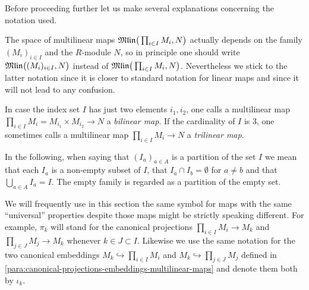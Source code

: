 \begin{remarks}
  Before proceeding further let us make several explanations concerning the notation used.
  \begin{environmentlist}
  \item
    The space of multilinear maps $ \mathfrak{Mlin} \big(\prod_{i\in I} M_i,N\big)$ actually depends
    on the family $(M_i)_{i\in I}$ and the $R$-module $N$, so in principle one should  write
    $ \mathfrak{Mlin} \big((M_i)_{i\in I},N\big)$ instead of $ \mathfrak{Mlin} \big(\prod_{i\in I} M_i,N\big)$.
    Nevertheless we stick to the latter notation since it is closer to standard notation for
    linear maps and since it will not lead  to any confusion.
  \item
    In case the index set $I$ has just two elements $i_1,i_2$, one calls a multilinear map
    $\prod_{i\in I}M_i = M_{i_1}\times M_{i_2} \to N$ a \emph{bilinear map}. If the cardinality of
    $I$ is $3$, one sometimes calls a multilinear map $\prod_{i\in I}M_i \to N$ a
    \emph{trilinear map}. 
    
  \item
     In the following, when saying that $(I_a)_{a\in A}$ is a partition of the set $I$ we mean that
  each $I_a$ is a non-empty subset of $I$, that $I_a   \cap I_b =\emptyset $
  for $a \neq b$ and that $\bigcup_{a \in A} I_a = I$. The empty family is regarded as
  a partition of the empty set.
    
  \item We will frequently use in this section the same symbol for 
  maps with the same ``universal'' properties  despite those maps might be  strictly speaking different. 
  For example, $\pi_k$ will stand for the canonical projections
  $\prod_{i\in I} M_i \to M_k$ and $\prod_{j\in J} M_j \to M_k$ whenever $k\in J \subset I$. 
  Likewise we use the same notation for the two canonical embeddings 
  $M_k \hookrightarrow \prod_{i\in I} M_i $ and $M_k \hookrightarrow \prod_{j\in J} M_j $
  defined in \ref{para:canonical-projections-embeddings-multilinear-maps} and denote them both by $\iota_k$.

  \end{environmentlist}
\end{remarks}

